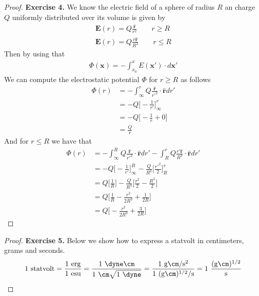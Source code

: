 \documentclass[11pt]{article}
\newcommand{\hatr}{\bm{\hat{r}}}
\newcommand{\vecx}{\bm{x}}
\theoremstyle{definition}
\begin{document}
\begin{proof}{\textbf{Exercise 4.}}
    We know the electric field of a sphere of radius $R$ an charge $Q$
    uniformly distributed over its volume is given by
    \begin{align*}
        \bm{E}(r) = Q\frac{\hatr}{r^2} \quad\quad r \geq R\\
        \bm{E}(r) = Q\frac{r\hatr}{R^3} \quad\quad r \leq R
    \end{align*}
    Then by using that
    \begin{align*}
        \Phi(\vecx) = - \int_{x_0}^x E(\vecx')\cdot d\vecx'
    \end{align*}
    We can compute the electrostatic potential $\Phi$ for $r \geq R$ as follows
    \begin{align*}
        \Phi(r) &= - \int_{\infty}^r Q\frac{\hatr}{r'^2}\cdot \hatr dr'\\
        &= - Q\bigg[-\frac{1}{r'}\bigg]_{\infty}^r\\
        &= - Q\bigg[-\frac{1}{r} + 0\bigg]\\
        &= \frac{Q}{r}
    \end{align*}
    And for $r \leq R$ we have that
    \begin{align*}
        \Phi(r) &= - \int_{\infty}^R Q\frac{\hatr}{r'^2}\cdot \hatr dr'
        - \int_{R}^r Q\frac{r'\hatr}{R^3}\cdot \hatr dr'\\
        &= - Q\bigg[-\frac{1}{r'}\bigg]_{\infty}^R
        - \frac{Q}{R^3}\bigg[\frac{r'^2}{2}\bigg]_{R}^r\\
        &= Q\bigg[\frac{1}{R}\bigg] 
        - \frac{Q}{R^3}\bigg[\frac{r^2}{2} - \frac{R^2}{2}\bigg]\\
        &= Q\bigg[\frac{1}{R} - \frac{r^2}{2R^3} + \frac{1}{2R}\bigg]\\
        &= Q\bigg[- \frac{r^2}{2R^3} + \frac{3}{2R}\bigg]
    \end{align*}
\end{proof}
\begin{proof}{\textbf{Exercise 5.}}
Below we show how to express a statvolt in centimeters, grams and seconds.
    \begin{align*}
        1~\text{statvolt} = \frac{1~\text{erg}}{1~\text{esu}}
        = \frac{1~\dyne \cm}{1~\cm\sqrt{1~\dyne}}
        = \frac{1~\text{g}\cm / \text{s}^2}{1~(\text{g}\cm)^{1/2} / \text{s}}
        = 1~\frac{(\text{g}\cm)^{1/2}}{\text{s}}
    \end{align*}
\end{proof}
\end{document}
